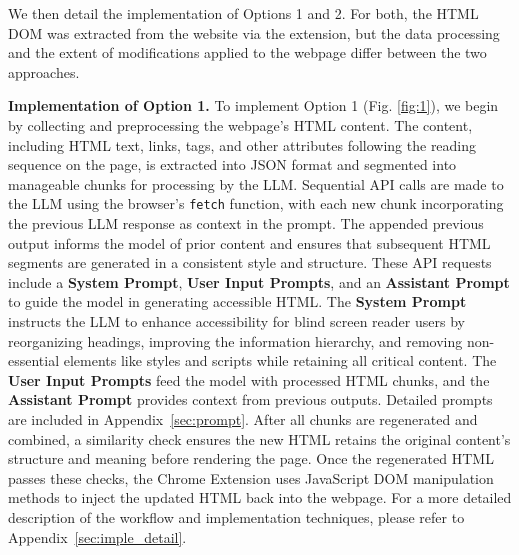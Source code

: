 We then detail the implementation of Options 1 and 2. For both, the HTML DOM was extracted from the website via the extension, but the data processing and the extent of modifications applied to the webpage differ between the two approaches.


\indent \textbf{Implementation of Option 1.} 
To implement Option 1 (Fig. \ref{fig:1}), we begin by collecting and preprocessing the webpage's HTML content. The content, including HTML text, links, tags, and other attributes following the reading sequence on the page, is extracted into JSON format and segmented into manageable chunks for processing by the LLM. Sequential API calls are made to the LLM using the browser's \texttt{fetch} function, with each new chunk incorporating the previous LLM response as context in the prompt. The appended previous output informs the model of prior content and ensures that subsequent HTML segments are generated in a consistent style and structure. These API requests include a \textbf{System Prompt}, \textbf{User Input Prompts}, and an \textbf{Assistant Prompt} to guide the model in generating accessible HTML. The \textbf{System Prompt} instructs the LLM to enhance accessibility for blind screen reader users by reorganizing headings, improving the information hierarchy, and removing non-essential elements like styles and scripts while retaining all critical content. The \textbf{User Input Prompts} feed the model with processed HTML chunks, and the \textbf{Assistant Prompt} provides context from previous outputs. Detailed prompts are included in Appendix~\ref{sec:prompt}. After all chunks are regenerated and combined, a similarity check ensures the new HTML retains the original content's structure and meaning before rendering the page. Once the regenerated HTML passes these checks, the Chrome Extension uses JavaScript DOM manipulation methods to inject the updated HTML back into the webpage. For a more detailed description of the workflow and implementation techniques, please refer to Appendix~\ref{sec:imple_detail}.




